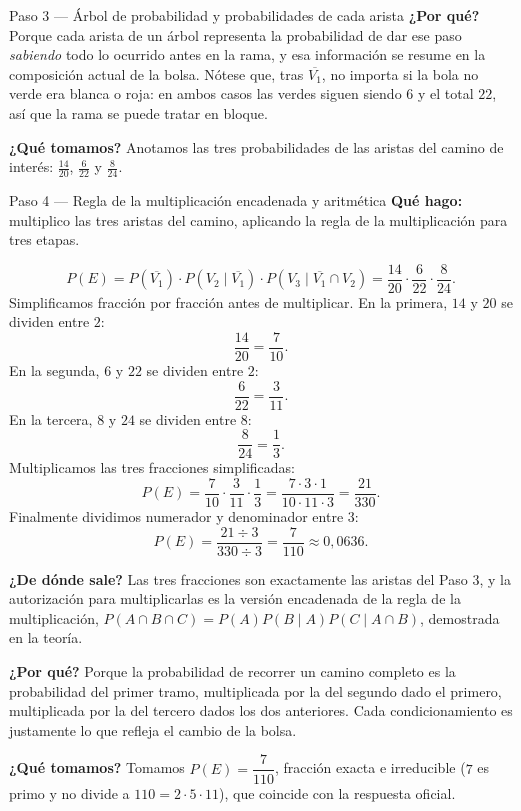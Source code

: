 \documentclass[11pt]{article}
\begin{document}
\begin{paso}{Paso 3 --- Árbol de probabilidad y probabilidades de cada arista}
\textbf{¿Por qué?} Porque cada arista de un árbol representa la probabilidad de dar ese paso \emph{sabiendo} todo lo ocurrido antes en la rama, y esa información se resume en la composición actual de la bolsa. Nótese que, tras $\overline{V_1}$, no importa si la bola no verde era blanca o roja: en ambos casos las verdes siguen siendo $6$ y el total $22$, así que la rama se puede tratar en bloque.

\textbf{¿Qué tomamos?} Anotamos las tres probabilidades de las aristas del camino de interés: $\tfrac{14}{20}$, $\tfrac{6}{22}$ y $\tfrac{8}{24}$.
\end{paso}

\begin{paso}{Paso 4 --- Regla de la multiplicación encadenada y aritmética}
\textbf{Qué hago:} multiplico las tres aristas del camino, aplicando la regla de la multiplicación para tres etapas.

\[
P(E)=P(\overline{V_1})\cdot P(V_2\mid \overline{V_1})\cdot P(V_3\mid \overline{V_1}\cap V_2)
=\frac{14}{20}\cdot\frac{6}{22}\cdot\frac{8}{24}.
\]
Simplificamos fracción por fracción antes de multiplicar. En la primera, $14$ y $20$ se dividen entre $2$:
\[
\frac{14}{20}=\frac{7}{10}.
\]
En la segunda, $6$ y $22$ se dividen entre $2$:
\[
\frac{6}{22}=\frac{3}{11}.
\]
En la tercera, $8$ y $24$ se dividen entre $8$:
\[
\frac{8}{24}=\frac{1}{3}.
\]
Multiplicamos las tres fracciones simplificadas:
\[
P(E)=\frac{7}{10}\cdot\frac{3}{11}\cdot\frac{1}{3}
=\frac{7\cdot 3\cdot 1}{10\cdot 11\cdot 3}
=\frac{21}{330}.
\]
Finalmente dividimos numerador y denominador entre $3$:
\[
P(E)=\frac{21\div 3}{330\div 3}=\frac{7}{110}\approx 0{,}0636 .
\]

\textbf{¿De dónde sale?} Las tres fracciones son exactamente las aristas del Paso 3, y la autorización para multiplicarlas es la versión encadenada de la regla de la multiplicación,
$P(A\cap B\cap C)=P(A)P(B\mid A)P(C\mid A\cap B)$, demostrada en la teoría.

\textbf{¿Por qué?} Porque la probabilidad de recorrer un camino completo es la probabilidad del primer tramo, multiplicada por la del segundo dado el primero, multiplicada por la del tercero dados los dos anteriores. Cada condicionamiento es justamente lo que refleja el cambio de la bolsa.

\textbf{¿Qué tomamos?} Tomamos $P(E)=\dfrac{7}{110}$, fracción exacta e irreducible ($7$ es primo y no divide a $110=2\cdot 5\cdot 11$), que coincide con la respuesta oficial.
\end{paso}
\end{document}
